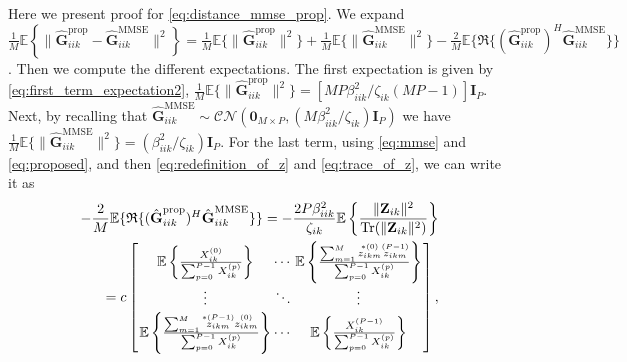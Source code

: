 \documentclass[10pt,journal,comsoc,final]{IEEEtran}
\DeclareMathOperator{\Tr}{Tr}
\begin{document}
\section{}
Here we present proof for \eqref{eq:distance_mmse_prop}. We expand $\frac{1}{M} \mathbb{E} \left\lbrace \lVert \hat{\textbf{G}}_{iik}^{\text{prop}} - \hat{\textbf{G}}_{iik}^{\text{MMSE}} \rVert^{2} \right\rbrace = \frac{1}{M}\mathbb{E}\{ \lVert \hat{\textbf{G}}_{iik}^{\text{prop}} \rVert^{2} \} + \frac{1}{M}\mathbb{E}\{ \lVert \hat{\textbf{G}}_{iik}^{\text{MMSE}} \rVert^{2} \} - \frac{2}{M}\mathbb{E} \{\mathfrak{R}\{ (\hat{\textbf{G}}_{iik}^{\text{prop}})^{H} \hat{\textbf{G}}_{iik}^{\text{MMSE}} \}\}$. Then we compute the different expectations. The first expectation is given by \eqref{eq:first_term_expectation2}, $\frac{1}{M}\mathbb{E}\{ \lVert \hat{\textbf{G}}_{iik}^{\text{prop}} \rVert^{2} \} = \left[ {MP \beta_{iik}^{2}} / {\zeta_{ik}(MP-1)} \right] \textbf{I}_{P}$. Next, by recalling that $\hat{\textbf{G}}_{iik}^{\text{MMSE}} \sim \mathcal{CN}(\textbf{0}_{M \times P}, ({M \beta_{iik}^{2}} / {\zeta_{ik}} )  \textbf{I}_{P})$ we have $\frac{1}{M}\mathbb{E}\{ \lVert \hat{\textbf{G}}_{iik}^{\text{MMSE}} \rVert^{2} \} = ( {\beta_{iik}^{2}}  / {\zeta_{ik}} ) \textbf{I}_{P}$. For the last term, using \eqref{eq:mmse} and \eqref{eq:proposed}, and then \eqref{eq:redefinition_of_z} and \eqref{eq:trace_of_z}, we can write it as
\begin{equation}\label{eq:appendix_b_1}
\begin{split}
-\frac{2}{M}\mathbb{E} \{\mathfrak{R}\{ (\hat{\textbf{G}}_{iik}^{\text{prop}})^{H} \hat{\textbf{G}}_{iik}^{\text{MMSE}} \}\} = -\frac{2P \beta_{iik}^{2}}{\zeta_{ik}} \mathbb{E} \left\lbrace \frac{\lVert \textbf{Z}_{ik} \rVert^2}{ \Tr ( \lVert \textbf{Z}_{ik} \rVert^{2} ) } \right\rbrace \\ = c \arraycolsep=1pt\def\arraystretch{1.5} \left[\begin{array}{ccc}
\mathbb{E} \left\lbrace \frac{ X_{ik}^{(0)} }{ \sum_{p=0}^{P-1} X_{ik}^{(p)} } \right\rbrace & \cdots & \mathbb{E} \left\lbrace \frac{ \sum_{m=1}^{M}{ \overset{*(0)}{{z}_{ikm}} \overset{(P-1)}{{z}_{ikm}} } }{ \sum_{p=0}^{P-1} X_{ik}^{(p)} } \right\rbrace \\
\vdots & \ddots & \vdots \\ 
\mathbb{E} \left\lbrace \frac{ \sum_{m=1}^{M}{ \overset{*(P-1)}{{z}_{ikm}} \overset{(0)}{{z}_{ikm}} } }{ \sum_{p=0}^{P-1} X_{ik}^{(p)} } \right\rbrace & \cdots & \mathbb{E} \left\lbrace \frac{ X_{ik}^{(P-1)} }{ \sum_{p=0}^{P-1} X_{ik}^{(p)} } \right\rbrace  \end{array} \right],
\end{split}
\end{equation}
\end{document}
